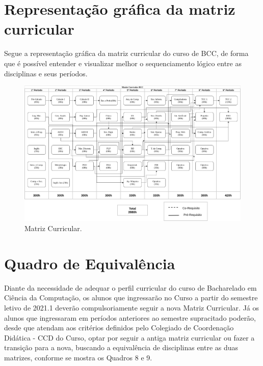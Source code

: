 \section{Representação gráfica da matriz curricular}

Segue a representação gráfica da matriz curricular do curso de BCC, de forma que é possível entender e visualizar melhor o sequenciamento lógico entre as disciplinas e seus períodos.

\begin{figure}[!htb]
  \centering
  \caption{\label{fig:matriz-curricular}Matriz Curricular.}
  
  \includegraphics[width=\textwidth]{images/matriz_curricular_v3.png}
\end{figure}

\section{Quadro de Equivalência}

Diante da necessidade de adequar o perfil curricular do curso de Bacharelado em Ciência da Computação, os alunos que ingressarão no Curso a partir do semestre letivo de 2021.1 deverão compulsoriamente seguir a nova Matriz Curricular. Já os alunos que ingressaram em períodos anteriores ao semestre supracitado poderão, desde que atendam aos critérios definidos pelo Colegiado de Coordenação Didática - CCD do Curso, optar por seguir a antiga matriz curricular ou fazer a transição para a nova, buscando a equivalência de disciplinas entre as duas matrizes, conforme se mostra os Quadros 8 e 9. 

